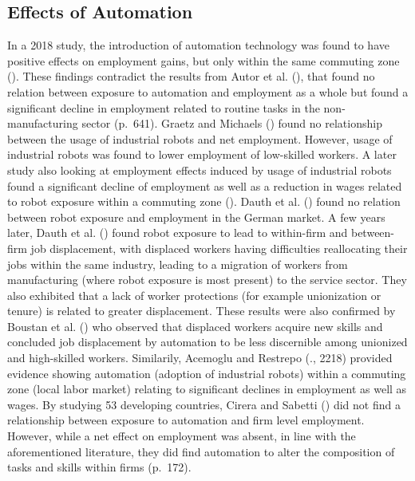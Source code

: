 \documentclass[
  12pt,
  a4paperpaper,
]{article}
\begin{document}
\subsection{Effects of
Automation}\label{sec-effects-of-automation-on-labor}

In a 2018 study, the introduction of automation technology was found to
have positive effects on employment gains, but only within the same
commuting zone (). These findings contradict the results from Autor et al.
(), that found no
relation between exposure to automation and employment as a whole but
found a significant decline in employment related to routine tasks in
the non-manufacturing sector (p.~641). Graetz and Michaels
() found no relationship
between the usage of industrial robots and net employment. However,
usage of industrial robots was found to lower employment of low-skilled
workers. A later study also looking at employment effects induced by
usage of industrial robots found a significant decline of employment as
well as a reduction in wages related to robot exposure within a
commuting zone (). Dauth et al.
() found no relation
between robot exposure and employment in the German market. A few years
later, Dauth et al. () found robot exposure to lead to within-firm and between-firm
job displacement, with displaced workers having difficulties
reallocating their jobs within the same industry, leading to a migration
of workers from manufacturing (where robot exposure is most present) to
the service sector. They also exhibited that a lack of worker
protections (for example unionization or tenure) is related to greater
displacement. These results were also confirmed by Boustan et al.
() who observed
that displaced workers acquire new skills and concluded job displacement
by automation to be less discernible among unionized and high-skilled
workers. Similarily, Acemoglu and Restrepo
(., 2218) provided
evidence showing automation (adoption of industrial robots) within a
commuting zone (local labor market) relating to significant declines in
employment as well as wages. By studying 53 developing countries, Cirera
and Sabetti () did not
find a relationship between exposure to automation and firm level
employment. However, while a net effect on employment was absent, in
line with the aforementioned literature, they did find automation to
alter the composition of tasks and skills within firms (p.~172).
\end{document}
